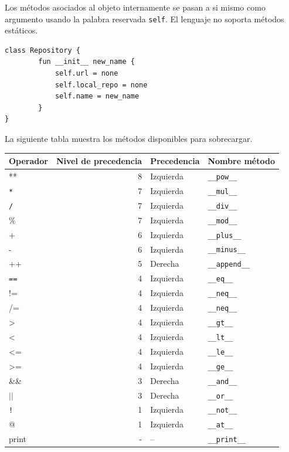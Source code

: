 \documentclass[11pt]{article}
\begin{document}
Los métodos asociados al objeto internamente se pasan a si mismo como argumento usando la palabra
reservada \texttt{self}. El lenguaje no soporta métodos estáticos.


\begin{verbatim}
class Repository {
        fun __init__ new_name {
            self.url = none
            self.local_repo = none
            self.name = new_name
        }
}
\end{verbatim}

La siguiente tabla muestra los métodos disponibles para sobrecargar.

\begin{center}
\begin{tabular}{lrll}
Operador & Nivel de precedencia & Precedencia & Nombre método\\
\hline
** & 8 & Izquierda & \texttt{\_\_pow\_\_}\\
\texttt{*} & 7 & Izquierda & \texttt{\_\_mul\_\_}\\
\texttt{/} & 7 & Izquierda & \texttt{\_\_div\_\_}\\
\% & 7 & Izquierda & \texttt{\_\_mod\_\_}\\
+ & 6 & Izquierda & \texttt{\_\_plus\_\_}\\
- & 6 & Izquierda & \texttt{\_\_minus\_\_}\\
++ & 5 & Derecha & \texttt{\_\_append\_\_}\\
\texttt{==} & 4 & Izquierda & \texttt{\_\_eq\_\_}\\
!= & 4 & Izquierda & \texttt{\_\_neq\_\_}\\
/= & 4 & Izquierda & \texttt{\_\_neq\_\_}\\
> & 4 & Izquierda & \texttt{\_\_gt\_\_}\\
< & 4 & Izquierda & \texttt{\_\_lt\_\_}\\
<= & 4 & Izquierda & \texttt{\_\_le\_\_}\\
>= & 4 & Izquierda & \texttt{\_\_ge\_\_}\\
\&\& & 3 & Derecha & \texttt{\_\_and\_\_}\\
\(\vert{} \vert{}\) & 3 & Derecha & \texttt{\_\_or\_\_}\\
\texttt{!} & 1 & Izquierda & \texttt{\_\_not\_\_}\\
@ & 1 & Izquierda & \texttt{\_\_at\_\_}\\
print & - & -- & \texttt{\_\_print\_\_}\\
\end{tabular}
\end{center}
\end{document}
